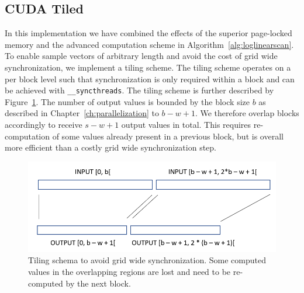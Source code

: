 \subsection{CUDA Tiled}
In this implementation we have combined the effects of the superior page-locked memory and the advanced computation scheme in Algorithm~\ref{alg:loglinearscan}. To enable sample vectors of arbitrary length and avoid the cost of grid wide synchronization, we implement a tiling scheme. The tiling scheme operates on a per block level such that synchronization is only required within a block and can be achieved with \texttt{\_\_syncthreads}. The tiling scheme is further described by Figure~\ref{fig:tiled}. The number of output values is bounded by the block size $b$ as described in Chapter~\ref{ch:parallelization} to $b - w + 1$. We therefore overlap blocks accordingly to receive $s - w + 1$ output values in total. This requires re-computation of some values already present in a previous block, but is overall more efficient than a costly grid wide synchronization step.

\begin{figure}
    \centering
    \includegraphics[width=0.8\linewidth]{Figures/tiling}
    \caption{Tiling schema to avoid grid wide synchronization. Some computed values in the overlapping regions are lost and need to be re-computed by the next block.}
    \label{fig:tiled}
\end{figure}




